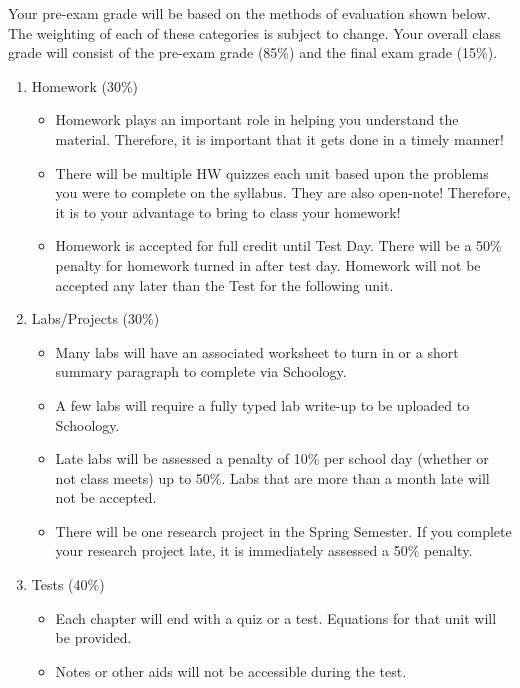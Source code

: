 \documentclass[10pt]{exam}
\begin{document}
Your pre-exam grade will be based on the methods of 
evaluation shown below. The weighting of each of these 
categories is subject to change. Your overall class 
grade will consist of the pre-exam grade (85\%) and the
final exam grade (15\%).

\begin{enumerate}
	\item	Homework (30\%)
	\begin{itemize}
		\item 
			Homework plays an important role in helping you understand the material.  Therefore, it is important that it gets done in a timely manner! 
		\item 
			There will be multiple HW quizzes each unit based upon the problems you were to complete on the syllabus. They are also open-note!  Therefore, it is to your advantage to bring to class your homework!
		\item 
			Homework is accepted for full credit until Test Day.  There will be a 50\% penalty for homework turned in after test day.  Homework will not be accepted any later than the Test for the following unit.
	\end{itemize}
	\item	Labs/Projects (30\%)
	\begin{itemize}
		\item 
			Many labs will have an associated worksheet to turn in or a short summary paragraph to complete via Schoology.  
		\item 
			A few labs will require a fully typed lab write-up to be uploaded to Schoology.
		\item 
			Late labs will be assessed a penalty of 10\% per school day (whether or not class meets) up to 50\%.  Labs that are more than a month late will not be accepted.
		\item 
			There will be one research project in the Spring Semester.  If you complete your research project late, it is immediately assessed a 50\% penalty.
	\end{itemize}
	\item	Tests (40\%)
	\begin{itemize}
		\item	
			Each chapter will end with a quiz or a test.  Equations for that unit will be provided.
		\item 
			Notes or other aids will not be accessible during the test.
	\end{itemize}
	
\end{enumerate}
\end{document}
